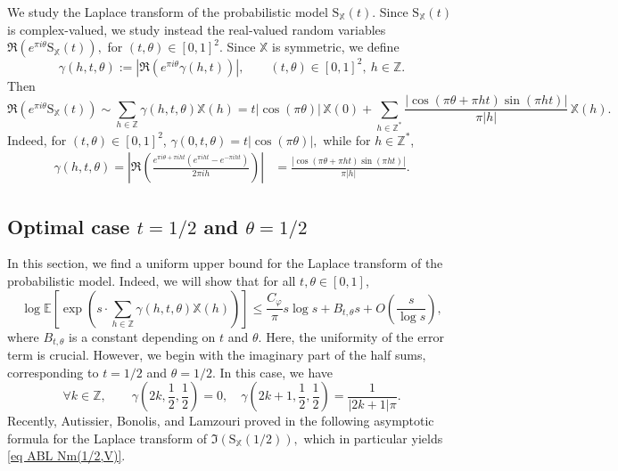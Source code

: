 \documentclass[12pt]{amsart}
\theoremstyle{definition}
\numberwithin{equation}{section}
\numberwithin{equation}{section}
\def\E{\mathbb{E}}
\def\Z{\mathbb{Z}}
\def\Mp{C_\varphi}
\def\S{\mathrm{S}}
\def\X{\mathbb{X}}
\def\E{\mathbb{E}}
\begin{document}
We study the Laplace transform of the probabilistic model \(\S_\X(t)\). Since \(\S_\X(t)\) is complex-valued, we study instead the real-valued random variables
$
\Re\!\left(e^{\pi i\theta}\S_\X(t)\right)\!,
$  for $(t,\theta)\in[0,1]^2.
$
Since \(\X\) is symmetric, we define
\[
\gamma(h,t,\theta)
:= \left|\Re\!\left(e^{\pi i\theta}\gamma(h,t)\right)\right|,
\qquad (t,\theta)\in[0,1]^2,\ h\in\Z.
\]
Then
\begin{equation*}
\Re\!\left(e^{\pi i\theta}\S_\X(t)\right)
\sim
\sum_{h\in\Z}\gamma(h,t,\theta)\X(h)
=
t|\cos(\pi\theta)|\,\X(0)
+
\sum_{h\in\Z^*}
\frac{|\cos(\pi\theta+\pi ht)\sin(\pi ht)|}{\pi|h|}
\,\X(h).
\end{equation*}
Indeed, for \((t,\theta)\in[0,1]^2\), $
\gamma(0,t,\theta)
=
t|\cos(\pi\theta)|,
$
while for \(h\in\Z^*\),
\begin{align*}
\gamma(h,t,\theta) =
\left|
\Re\!\left(
\frac{
e^{\pi i\theta+\pi i ht}
\left(e^{\pi i ht}-e^{-\pi i ht}\right)
}{2\pi i h}
\right)
\right|
&=
\frac{|\cos(\pi\theta+\pi ht)\sin(\pi ht)|}{\pi|h|}.
\end{align*}




\subsection{Optimal case $t=1/2$ and $\theta = 1/2$}
In this section, we find a uniform upper bound for the Laplace transform of the probabilistic model. Indeed, we will show that for all $t,\theta\in [0,1]$,
\[
\log \E \left[\exp \left(s \cdot \sum_{h\in \Z} \gamma(h,t,\theta)\X(h)\right) \right] 
\leq 
\frac{\Mp}{\pi}s\log s +B_{t,\theta}s +O\left(\frac{s}{\log s}\right),
\]
where $B_{t,\theta}$ is a constant depending on $t$ and $\theta$.
Here, the uniformity of the error term is crucial. However, we begin with the imaginary part of the half sums, corresponding to \(t=1/2\) and \(\theta=1/2\). In this case, we have
\begin{equation}\label{eq gamma(h,1/2,1/2)}
    \forall k \in \Z, \qquad
\gamma\left(2k,\frac{1}{2},\frac{1}{2}\right)=0,
\quad
\gamma\left(2k+1,\frac{1}{2},\frac{1}{2}\right)
=
\frac{1}{|2k+1|\pi}.
\end{equation}
Recently, Autissier, Bonolis, and Lamzouri proved in \cite{ABL21} the following asymptotic formula for the Laplace transform of $
\Im\!\left(\S_\X(1/2)\right),$ which in particular yields \eqref{eq ABL Nm(1/2,V)}.
\end{document}
